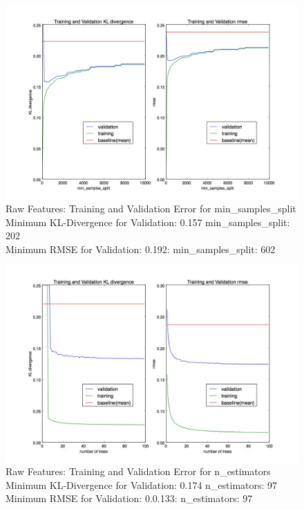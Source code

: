 \documentclass[10pt]{article}
\begin{document}
\begin{figure}
\begin{center}
\includegraphics[scale=0.4]{images/Raw_Features_Decision_Tree_min_samples_split.jpg}
\caption{Raw Features: Training and Validation Error for min\_samples\_split \\
         Minimum KL-Divergence for Validation: 0.157 min\_samples\_split: 202 \\
         Minimum RMSE for Validation: 0.192: min\_samples\_split: 602}
\label{fig:rawdreval}
\end{center}
\end{figure}


\begin{figure}
\begin{center}
\includegraphics[scale=0.4]{images/Raw_Features_Random_Forest_n_estimators.jpg}
\caption{Raw Features: Training and Validation Error for n\_estimators \\
         Minimum KL-Divergence for Validation: 0.174 n\_estimators: 97 \\
         Minimum RMSE for Validation: 0.0.133: n\_estimators: 97}
\label{fig:rawdreval}
\end{center}
\end{figure}
\end{document}
